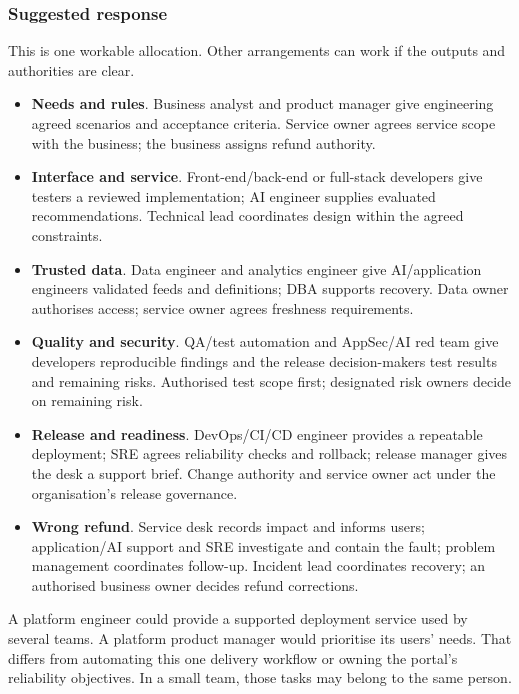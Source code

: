 \subsubsection{Suggested response}


This is one workable allocation. Other arrangements can work if the outputs and authorities are clear.


\begin{itemize}[leftmargin=*]
\item \textbf{Needs and rules}. Business analyst and product manager give engineering agreed scenarios and acceptance criteria. Service owner agrees service scope with the business; the business assigns refund authority.
\item \textbf{Interface and service}. Front-end/back-end or full-stack developers give testers a reviewed implementation; AI engineer supplies evaluated recommendations. Technical lead coordinates design within the agreed constraints.
\item \textbf{Trusted data}. Data engineer and analytics engineer give AI/application engineers validated feeds and definitions; DBA supports recovery. Data owner authorises access; service owner agrees freshness requirements.
\item \textbf{Quality and security}. QA/test automation and AppSec/AI red team give developers reproducible findings and the release decision-makers test results and remaining risks. Authorised test scope first; designated risk owners decide on remaining risk.
\item \textbf{Release and readiness}. DevOps/CI/CD engineer provides a repeatable deployment; SRE agrees reliability checks and rollback; release manager gives the desk a support brief. Change authority and service owner act under the organisation's release governance.
\item \textbf{Wrong refund}. Service desk records impact and informs users; application/AI support and SRE investigate and contain the fault; problem management coordinates follow-up. Incident lead coordinates recovery; an authorised business owner decides refund corrections.
\end{itemize}

A platform engineer could provide a supported deployment service used by several teams. A platform product manager would prioritise its users' needs. That differs from automating this one delivery workflow or owning the portal's reliability objectives. In a small team, those tasks may belong to the same person.


